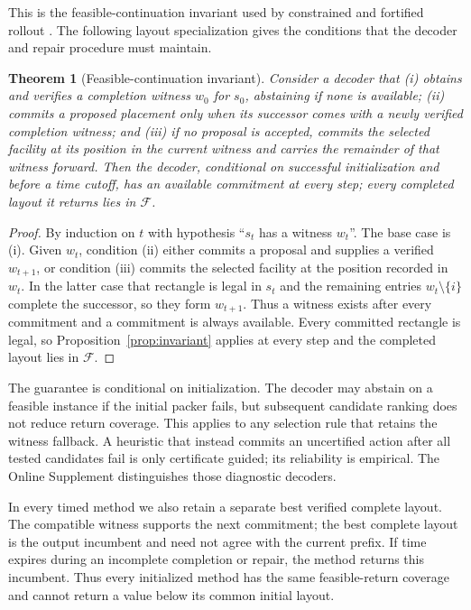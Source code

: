 \documentclass[preprint,12pt,authoryear,nonatbib]{elsarticle}
\newtheorem{thm}{Theorem}
\newcommand{\cF}{\mathcal{F}}
\begin{document}
This is the feasible-continuation invariant used by constrained and fortified
rollout \citep{Bertsekas2005Constrained,Bertsekas2020Constrained}. The following
layout specialization gives the conditions that the decoder and repair
procedure must maintain.

\begin{thm}[Feasible-continuation invariant]
\label{thm:certified}
Consider a decoder that (i) obtains and verifies a completion witness $w_0$ for
$s_0$, abstaining if none is available; (ii) commits a proposed placement only
when its successor comes with a newly verified completion witness; and (iii) if
no proposal is accepted, commits the selected facility at its position in the
current witness and carries the remainder of that witness forward. Then the
decoder, conditional on successful initialization and before a time cutoff,
has an available commitment at every step; every completed layout it returns
lies in $\cF$.
\end{thm}
\begin{proof}
By induction on $t$ with hypothesis ``$s_t$ has a witness $w_t$''. The base case
is (i). Given $w_t$, condition (ii) either commits a proposal and supplies a
verified $w_{t+1}$, or condition (iii) commits the selected facility at the
position recorded in $w_t$. In the latter case that rectangle is legal in $s_t$
and the remaining entries $w_t\setminus\{i\}$ complete the successor, so they
form $w_{t+1}$. Thus a witness exists after every commitment and a commitment is
always available. Every committed rectangle is legal, so
Proposition~\ref{prop:invariant} applies at every step and the completed layout
lies in $\cF$.
\end{proof}

The guarantee is conditional on initialization. The decoder may abstain on a
feasible instance if the initial packer fails, but subsequent candidate ranking
does not reduce return coverage. This applies to any selection rule that retains
the witness fallback. A heuristic that instead commits an uncertified action
after all tested candidates fail is only certificate guided; its reliability
is empirical. The Online Supplement distinguishes those diagnostic decoders.

In every timed method we also retain a separate best verified complete layout.
The compatible witness supports the next commitment; the best complete layout
is the output incumbent and need not agree with the current prefix. If time
expires during an incomplete completion or repair, the method returns this
incumbent. Thus every initialized method has the same feasible-return coverage
and cannot return a value below its common initial layout.
\end{document}
